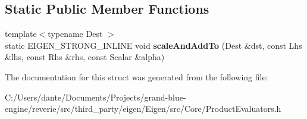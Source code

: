 \subsection*{Static Public Member Functions}
\begin{DoxyCompactItemize}
\item 
\mbox{\label{struct_eigen_1_1internal_1_1generic__product__impl_3_01_lhs_00_01_rhs_00_01_dense_shape_00_01_de08ea17a2bb9af046a7c3ddff957c62b0_a8baafd628addab2c5bc815dde9c8eb9b}} 
{\footnotesize template$<$typename Dest $>$ }\\static E\+I\+G\+E\+N\+\_\+\+S\+T\+R\+O\+N\+G\+\_\+\+I\+N\+L\+I\+NE void {\bfseries scale\+And\+Add\+To} (Dest \&dst, const Lhs \&lhs, const Rhs \&rhs, const Scalar \&alpha)
\end{DoxyCompactItemize}


The documentation for this struct was generated from the following file\+:\begin{DoxyCompactItemize}
\item 
C\+:/\+Users/dante/\+Documents/\+Projects/grand-\/blue-\/engine/reverie/src/third\+\_\+party/eigen/\+Eigen/src/\+Core/Product\+Evaluators.\+h\end{DoxyCompactItemize}
